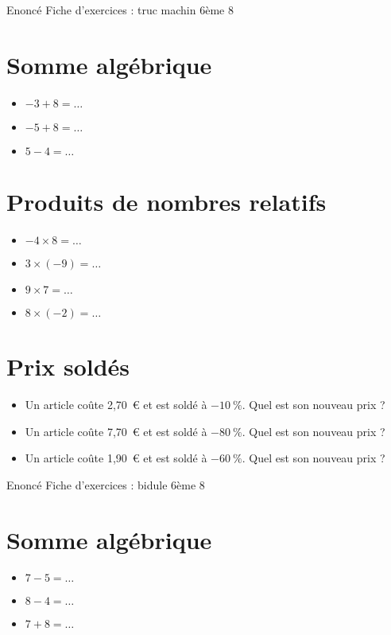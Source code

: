\documentclass[a4paper,11pt,fleqn]{article}
\begin{document}
\pagestyle{empty}


{Enoncé} \hfill {\huge Fiche d'exercices  : truc machin} \hfill {6ème 8}

\section{Somme algébrique}
\begin{itemize}

  \item $-3 +8=\ldots$
  \item $-5 +8=\ldots$
  \item $5 -4=\ldots$
\end{itemize}


\section{Produits de nombres relatifs}
\begin{itemize}

  \item $-4\times8=\ldots$
  \item $3\times(-9)=\ldots$
  \item $9\times7=\ldots$
  \item $8\times(-2)=\ldots$
\end{itemize}


\section{Prix soldés}
\begin{itemize}

  \item Un article coûte 2,70~€ et est soldé à $-10~\%$. Quel est son nouveau prix ?
  \item Un article coûte 7,70~€ et est soldé à $-80~\%$. Quel est son nouveau prix ?
  \item Un article coûte 1,90~€ et est soldé à $-60~\%$. Quel est son nouveau prix ?
\end{itemize}
\newpage
\setcounter{exo}{0}
\setcounter{section}{0}
{Enoncé} \hfill {\huge Fiche d'exercices  : bidule} \hfill {6ème 8}

\section{Somme algébrique}
\begin{itemize}

  \item $7 -5=\ldots$
  \item $8 -4=\ldots$
  \item $7 +8=\ldots$
\end{itemize}
\end{document}
